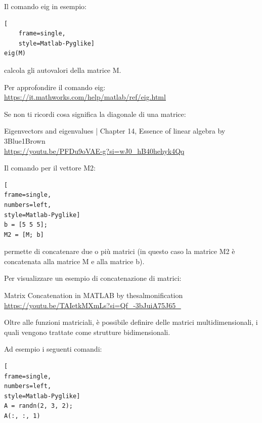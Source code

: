 Il comando eig in esempio: 

\begin{lstlisting}[
    frame=single,
    style=Matlab-Pyglike]
eig(M)  
\end{lstlisting}

calcola gli autovalori della matrice M. \newline 

\begin{tcolorbox}

    Per approfondire il comando eig: \\\url{https://it.mathworks.com/help/matlab/ref/eig.html}\newline 

    Se non ti ricordi cosa significa la diagonale di una matrice: \newline 

   Eigenvectors and eigenvalues | Chapter 14, Essence of linear algebra by 3Blue1Brown \\ 
   \url{https://youtu.be/PFDu9oVAE-g?si=wJ0_hB40hehyk4Qq}
\end{tcolorbox} 

Il comando per il vettore M2: 

\begin{lstlisting}[
frame=single,
numbers=left,
style=Matlab-Pyglike]
b = [5 5 5]; 
M2 = [M; b]
\end{lstlisting}

permette di concatenare due o più matrici (in questo caso la matrice M2 è concatenata alla matrice M e alla matrice b). \newline 

\begin{tcolorbox}
    Per visualizzare un esempio di concatenazione di matrici: \newline 

    Matrix Concatenation in MATLAB by thesalmonification \\ 
    \url{https://youtu.be/TAIetkMXmLs?si=Qf_-3bJuiA75J65_}
\end{tcolorbox}

Oltre alle funzioni matriciali, è possibile definire delle matrici multidimensionali, 
i quali vengono trattate come strutture bidimensionali. \newline 

Ad esempio i seguenti comandi: 

\begin{lstlisting}[
frame=single,
numbers=left,
style=Matlab-Pyglike]
A = randn(2, 3, 2); 
A(:, :, 1)
\end{lstlisting}

